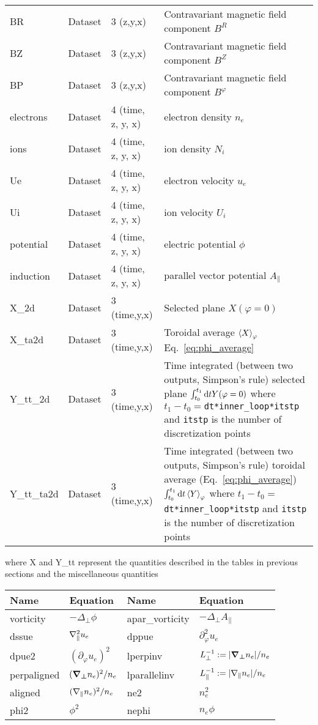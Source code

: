 \begin{longtable}{lll>{\RaggedRight}p{7cm}}
BR               & Dataset & 3 (z,y,x) & Contravariant magnetic field component $B^R$ \\
BZ               & Dataset & 3 (z,y,x) & Contravariant magnetic field component $B^Z$ \\
BP               & Dataset & 3 (z,y,x) & Contravariant magnetic field component $B^\varphi$ \\
electrons        & Dataset & 4 (time, z, y, x) & electron density $n_e$ \\
ions             & Dataset & 4 (time, z, y, x) & ion density $N_i$ \\
Ue               & Dataset & 4 (time, z, y, x) & electron velocity $u_e$ \\
Ui               & Dataset & 4 (time, z, y, x) & ion velocity $U_i$ \\
potential        & Dataset & 4 (time, z, y, x) & electric potential $\phi$ \\
induction        & Dataset & 4 (time, z, y, x) & parallel vector potential $A_\parallel$ \\
X\_2d            & Dataset & 3 (time,y,x) & Selected plane $X(\varphi=0)$ \\
X\_ta2d          & Dataset & 3 (time,y,x) & Toroidal average $\left \langle  X  \right\rangle_\varphi$
Eq.~\eqref{eq:phi_average} \\
Y\_tt\_2d        & Dataset & 3 (time,y,x) & Time integrated (between two outputs, Simpson's rule) selected plane
$\int_{t_0}^{t_1}\mathrm{d} t Y(\varphi=0) $
where $t_1 - t_0 = ${\tt dt*inner\_loop*itstp} and {\tt itstp} is the number of discretization points\\
Y\_tt\_ta2d      & Dataset & 3 (time,y,x) & Time integrated (between two outputs, Simpson's rule) toroidal average (Eq.~\eqref{eq:phi_average})
$\int_{t_0}^{t_1}\mathrm{d} t \left \langle  Y  \right\rangle_\varphi$
where $t_1 - t_0 = ${\tt dt*inner\_loop*itstp} and {\tt itstp} is the number of discretization points\\
\bottomrule
\end{longtable}
where
X and Y\_tt represent the quantities described in the tables in previous sections and the miscellaneous quantities
\begin{longtable}{llll}
\toprule
\rowcolor{gray!50}\textbf{Name} &  \textbf{Equation} & \textbf{Name} &  \textbf{Equation}\\
\midrule
    vorticity &$-\Delta_\perp\phi$ &
    apar\_vorticity &$-\Delta_\perp A_\parallel$ \\
    dssue & $\nabla_\parallel^2 u_e$&
    dppue & $\partial_\varphi^2 u_e$\\
    dpue2 & $(\partial_\varphi u_e)^2$&
    lperpinv &$L_\perp^{-1} := |{\boldsymbol{{\boldsymbol{\nabla}}_{\perp}}} n_e|/n_e$ \\
    perpaligned &$({\boldsymbol{{\boldsymbol{\nabla}}_{\perp}}} n_e)^2/n_e$ &
    lparallelinv &$L_\parallel^{-1} := |\nabla_\parallel n_e|/n_e$ \\
    aligned &$ (\nabla_\parallel n_e)^2/n_e$ &
    ne2 & $n_e^2$ \\
    phi2 & $\phi^2$ &
    nephi & $n_e\phi$ \\
\bottomrule
\end{longtable}
